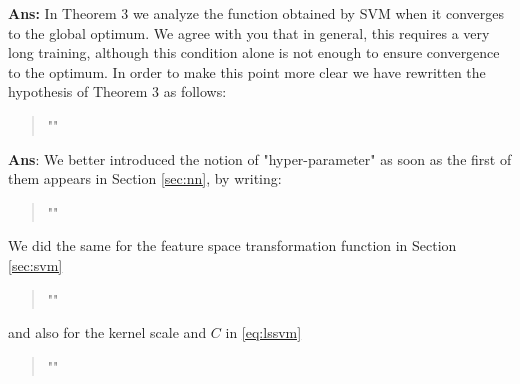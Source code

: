 \documentclass[draftcls,onecolumn,12pt]{IEEEtran}
\newcounter{revc}
\newcommand{\revp}[1]{\zref[revcontent]{#1}}
\begin{document}
\vspace{5mm} %

\begin{framed}
\end{framed}

{\bf Ans:} In Theorem 3 we analyze the function obtained by SVM when it converges to the global optimum. We agree with you that in general, this requires a very long training, although this condition alone is not enough to ensure convergence to the optimum. In order to make this point more clear we have rewritten the hypothesis of Theorem 3 as follows:
\begin{quote}
    "\revp{revGO}"
\end{quote}

\vspace{5mm} %
\begin{framed}
\end{framed}

{\bf Ans}: We better introduced the notion of "hyper-parameter" as soon as the first of them appears in Section \ref{sec:nn}, by writing:
\begin{quote}
	"\revp{hyper1}"
\end{quote}
We did the same for the feature space transformation function in Section \ref{sec:svm}
\begin{quote}
	"\revp{hyper2}"
\end{quote}
 and also for the kernel scale and $C$ in \eqref{eq:lssvm}
 \begin{quote}
 	"\revp{hyper3}"
 \end{quote} 

\vspace{5mm} %
\begin{framed}
\end{framed}
\end{document}
